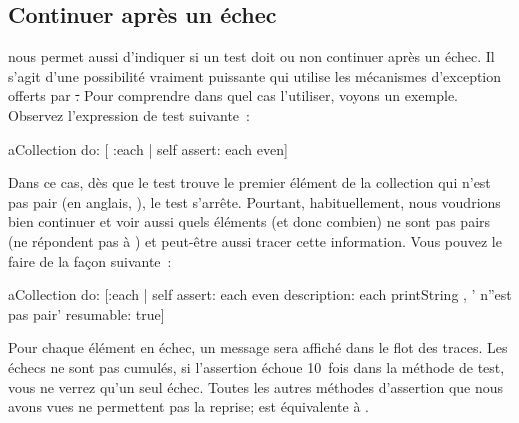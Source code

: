 \documentclass[a4paper,10pt,twoside]{book}
\begin{document}
\subsection{Continuer après un échec}
\sunit nous permet aussi d'indiquer si un test doit ou non continuer après un échec. Il s'agit d'une possibilité vraiment puissante qui utilise les mécanismes d'exception offerts par \st. Pour comprendre dans quel cas l'utiliser, voyons un exemple. Observez l'expression de test suivante~:
\begin{code}{}
aCollection do: [ :each | self assert: each even]
\end{code}
Dans ce cas, dès que le test trouve le premier élément de la collection qui n'est pas pair (en anglais, ), le test s'arrête. Pourtant, habituellement, nous voudrions bien continuer et voir aussi quels éléments (et donc combien) ne sont pas pairs (\ie ne répondent pas à ) et peut-être aussi tracer cette information. Vous pouvez le faire de la façon suivante~:
\begin{code}{}
aCollection do:
	[:each |
	self
		assert: each even
		description: each printString , ' n''est pas pair'
		resumable: true]
\end{code}
Pour chaque élément en échec, un message sera affiché dans le flot des traces. Les échecs ne sont pas cumulés, \ie si l'assertion échoue 10~fois dans la méthode de test, vous ne verrez qu'un seul échec. Toutes les autres méthodes d'assertion que nous avons vues ne permettent pas la reprise;
 est équivalente à .

\end{document}
